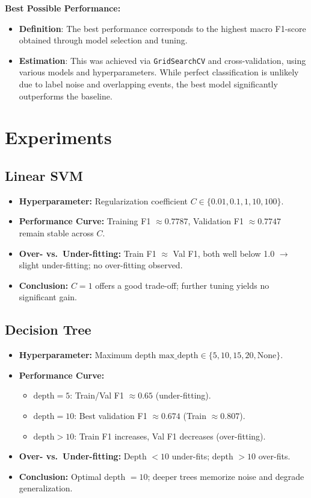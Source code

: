 \documentclass{article}
\begin{document}
\textbf{Best Possible Performance:}
\begin{itemize}
    \item \textbf{Definition}: The best performance corresponds to the highest macro F1-score obtained through model selection and tuning.
    \item \textbf{Estimation}: This was achieved via \texttt{GridSearchCV} and cross-validation, using various models and hyperparameters. While perfect classification is unlikely due to label noise and overlapping events, the best model significantly outperforms the baseline.
\end{itemize}

\section{Experiments}

\subsection{Linear SVM}
\begin{itemize}
  \item \textbf{Hyperparameter:} Regularization coefficient $C \in \{0.01, 0.1, 1, 10, 100\}$.
  \item \textbf{Performance Curve:} Training F1 $\approx0.7787$, Validation F1 $\approx0.7747$ remain stable across $C$.
  \item \textbf{Over- vs.\ Under-fitting:} Train F1 $\approx$ Val F1, both well below 1.0 $\rightarrow$ slight under-fitting; no over-fitting observed.
  \item \textbf{Conclusion:} $C=1$ offers a good trade-off; further tuning yields no significant gain.
\end{itemize}

\subsection{Decision Tree}
\begin{itemize}
  \item \textbf{Hyperparameter:} Maximum depth $\text{max\_depth} \in \{5, 10, 15, 20, \text{None}\}$.
  \item \textbf{Performance Curve:}
    \begin{itemize}
      \item $\text{depth}=5$: Train/Val F1 $\approx0.65$ (under-fitting).
      \item $\text{depth}=10$: Best validation F1 $\approx0.674$ (Train $\approx0.807$).
      \item $\text{depth}>10$: Train F1 increases, Val F1 decreases (over-fitting).
    \end{itemize}
  \item \textbf{Over- vs.\ Under-fitting:} Depth $<10$ under-fits; depth $>10$ over-fits.
  \item \textbf{Conclusion:} Optimal depth $=10$; deeper trees memorize noise and degrade generalization.
\end{itemize}
\end{document}
